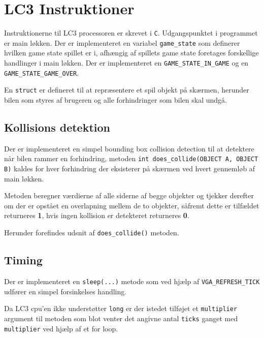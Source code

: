 \section{LC3 Instruktioner}
Instruktionerne til LC3 processoren er skrevet i \texttt{C}. Udgangspunktet i programmet er main løkken. Der er implementeret en variabel \texttt{game\_state} som definerer hvilken game state spillet er i, afhængig af spillets game state foretages forskellige handlinger i main løkken. Der er implementeret en \texttt{GAME\_STATE\_IN\_GAME} og en \texttt{GAME\_STATE\_GAME\_OVER}.

En \texttt{struct} er defineret til at repræsentere et spil objekt på skærmen, herunder bilen som styres af brugeren og alle forhindringer som bilen skal undgå.


\subsection*{Kollisions detektion}
Der er implementeret en simpel bounding box collision detection til at detektere når bilen rammer en forhindring, metoden \texttt{int does\_collide(OBJECT A, OBJECT B)} kaldes for hver forhindring der eksisterer på skærmen ved hvert gennemløb af main løkken.

Metoden beregner værdierne af alle siderne af begge objekter og tjekker derefter om der er opstået en overlapning mellem de to objekter, såfremt dette er tilfældet returneres \textbf{1}, hvis ingen kollision er detekteret returneres \textbf{0}.

Herunder forefindes udsnit af \texttt{does\_collide()} metoden.


\subsection*{Timing}
Der er implementeret en \texttt{sleep(...)} metode som ved hjælp af \texttt{VGA\_REFRESH\_TICK} udfører en simpel forsinkelses handling.


Da LC3 cpu'en ikke understøtter \texttt{long} er der istedet tilføjet et \texttt{multiplier} argument til metoden som blot venter det angivne antal \texttt{ticks} ganget med \texttt{multiplier} ved hjælp af et for loop.

